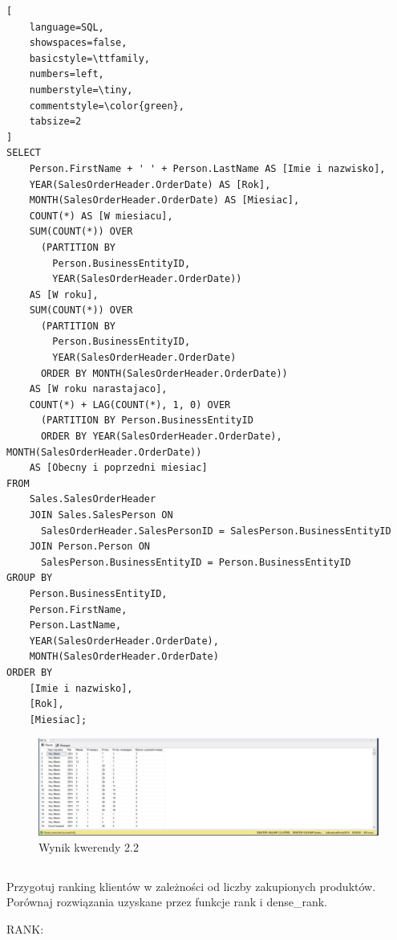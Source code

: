 \documentclass[a4paper,12pt]{article}
\begin{document}
{\small
\begin{lstlisting}[
	language=SQL,
	showspaces=false,
	basicstyle=\ttfamily,
	numbers=left,
	numberstyle=\tiny,
	commentstyle=\color{green},
	tabsize=2
]
SELECT 
    Person.FirstName + ' ' + Person.LastName AS [Imie i nazwisko],
    YEAR(SalesOrderHeader.OrderDate) AS [Rok],
    MONTH(SalesOrderHeader.OrderDate) AS [Miesiac],
    COUNT(*) AS [W miesiacu],
    SUM(COUNT(*)) OVER 
      (PARTITION BY
        Person.BusinessEntityID, 
        YEAR(SalesOrderHeader.OrderDate)) 
    AS [W roku],
    SUM(COUNT(*)) OVER 
      (PARTITION BY 
        Person.BusinessEntityID, 
        YEAR(SalesOrderHeader.OrderDate)                 
      ORDER BY MONTH(SalesOrderHeader.OrderDate)) 
    AS [W roku narastajaco],
    COUNT(*) + LAG(COUNT(*), 1, 0) OVER 
      (PARTITION BY Person.BusinessEntityID 
      ORDER BY YEAR(SalesOrderHeader.OrderDate), MONTH(SalesOrderHeader.OrderDate)) 
    AS [Obecny i poprzedni miesiac]
FROM 
    Sales.SalesOrderHeader
    JOIN Sales.SalesPerson ON 
      SalesOrderHeader.SalesPersonID = SalesPerson.BusinessEntityID
    JOIN Person.Person ON 
      SalesPerson.BusinessEntityID = Person.BusinessEntityID
GROUP BY 
    Person.BusinessEntityID,
    Person.FirstName,
    Person.LastName,
    YEAR(SalesOrderHeader.OrderDate),
    MONTH(SalesOrderHeader.OrderDate)
ORDER BY 
    [Imie i nazwisko],
    [Rok],
    [Miesiac];
\end{lstlisting}}

\begin{figure}[H]
  \centering
  \includegraphics[width=1.0\textwidth]{images/2.2.png}
  \caption{Wynik kwerendy 2.2}
\end{figure}

\subsection{}

Przygotuj ranking klientów w zależności od liczby zakupionych produktów. Porównaj rozwiązania uzyskane przez funkcje rank i dense\_rank.

RANK:
\end{document}
